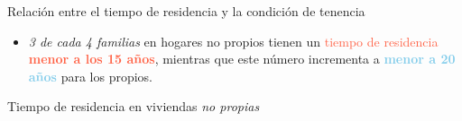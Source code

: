\documentclass[aspectratio=169]{beamer}
\begin{document}
\begin{frame}{Relación entre el tiempo de residencia y la condición de tenencia}
\begin{minipage}{.39\linewidth}
\begin{itemize}
                \item<4-> \textit{3 de cada 4 familias} en hogares no propios tienen un \textcolor{tomato}{tiempo de residencia \textbf{menor a los 15 años}}, mientras que este número incrementa a \textcolor{skyblue}{\textbf{menor a 20 años}} para los propios.
            \end{itemize}
        \end{minipage}
    \end{frame}
    
    \begin{frame}{Tiempo de residencia en viviendas \textit{no propias}}
        \begin{minipage}{.65\linewidth}
            \begin{overlayarea}{\linewidth}{.85\textheight}

\end{overlayarea}
\end{minipage}
\end{frame}
\end{document}
